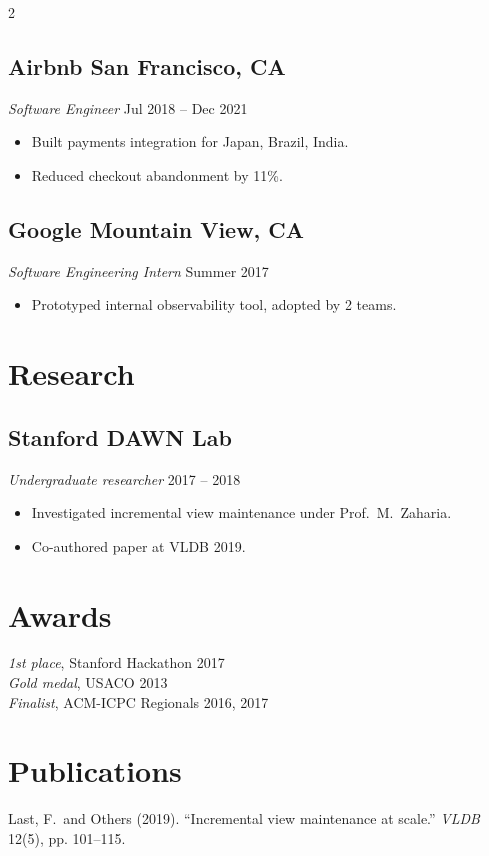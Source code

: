 \documentclass[10pt,letterpaper]{article}
\begin{document}
\begin{paracol}{2}
\subsection*{Airbnb \hfill \normalfont\footnotesize San Francisco, CA}
\textit{Software Engineer} \hfill {\footnotesize Jul 2018 -- Dec 2021}
\begin{itemize}[leftmargin=*,itemsep=1pt,topsep=2pt]
  \item Built payments integration for Japan, Brazil, India.
  \item Reduced checkout abandonment by 11\%.
\end{itemize}

\subsection*{Google \hfill \normalfont\footnotesize Mountain View, CA}
\textit{Software Engineering Intern} \hfill {\footnotesize Summer 2017}
\begin{itemize}[leftmargin=*,itemsep=1pt,topsep=2pt]
  \item Prototyped internal observability tool, adopted by 2 teams.
\end{itemize}

\section*{Research}
\subsection*{Stanford DAWN Lab}
\textit{Undergraduate researcher} \hfill {\footnotesize 2017 -- 2018}
\begin{itemize}[leftmargin=*,itemsep=1pt,topsep=2pt]
  \item Investigated incremental view maintenance under Prof.\ M.\ Zaharia.
  \item Co-authored paper at VLDB 2019.
\end{itemize}

\section*{Awards}
\textit{1st place}, Stanford Hackathon 2017 \\
\textit{Gold medal}, USACO 2013 \\
\textit{Finalist}, ACM-ICPC Regionals 2016, 2017

\section*{Publications}
Last, F.\ and Others (2019). ``Incremental view maintenance at scale.'' \textit{VLDB} 12(5), pp. 101--115.

\end{paracol}
\end{document}
